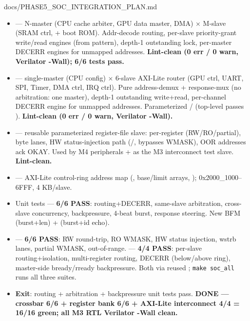 \begin{relocated}{docs/PHASE5_SOC_INTEGRATION_PLAN.md}
\begin{itemize}
\tightlist
\item
  \ok{}  --- N-master (CPU cache arbiter,
  GPU data master, DMA) × M-slave (SRAM ctrl, + boot ROM). Addr-decode
  routing, per-slave priority-grant write/\allowbreak{}read engines
  (from  pattern), depth-1 outstanding
  lock, per-master DECERR engines for unmapped addresses.
  \textbf{Lint-clean (0 err / 0 warn, Verilator -Wall); 6/6 tests pass.}
\item
  \ok{}  --- single-master (CPU
  config) × 6-slave AXI-Lite router (GPU ctrl, UART, SPI, Timer, DMA
  ctrl, IRQ ctrl). Pure address-demux + response-mux (no arbitration:
  one master), depth-1 outstanding write+read, per-channel DECERR engine
  for unmapped addresses. Parameterized /
  (top-level passes ). \textbf{Lint-clean (0
  err / 0 warn, Verilator -Wall).}
\item
  \ok{}  --- reusable
  parameterized register-file slave: per-register 
  (RW/\allowbreak{}RO/\allowbreak{}partial),  byte lanes, HW
  status-injection path (/, bypasses
  WMASK), OOR addresses ack OKAY. Used by M4 peripherals + as the M3
  interconnect test slave. \textbf{Lint-clean.}
\item
  \ok{}  --- AXI-Lite control-ring
  address map (, base/\allowbreak{}limit arrays,
  ); 0x2000\_\allowbreak{}1000--6FFF, 4
  KB/slave.
\item
  \ok{} Unit tests  --- \textbf{6/6
  PASS}: routing+DECERR, same-slave arbitration, cross-slave
  concurrency, backpressure, 4-beat burst, response steering. New BFM
   (burst+len) +
   (burst+id echo).
\item
  \ok{}  --- \textbf{6/6 PASS}:
  RW round-trip, RO WMASK, HW status injection, wstrb lanes, partial
  WMASK, out-of-range.  ---
  \textbf{4/4 PASS}: per-slave routing+isolation, multi-register
  routing, DECERR (below/\allowbreak{}above ring), master-side
  bready/\allowbreak{}rready backpressure. Both via reused
  ;
  \texttt{make\ soc\_\allowbreak{}all} runs all three suites.
\item
  \textbf{Exit}: routing + arbitration + backpressure unit tests pass.
  \textbf{\ok{} DONE --- crossbar 6/6 + register bank 6/6 + AXI-Lite
  interconnect 4/4 = 16/16 green; all M3 RTL Verilator -Wall clean.}
\end{itemize}


\end{relocated}
